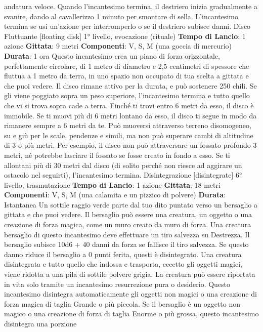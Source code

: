\begin{multicols}{2}
andatura veloce. Quando l’incantesimo termina, il
destriero inizia gradualmente a svanire, dando al
cavallerizzo 1 minuto per smontare di sella.
L’incantesimo termina se usi un’azione per
interromperlo o se il destriero subisce danni.
Disco Fluttuante
[floating disk]
1° livello, evocazione (rituale)
\textbf{Tempo di Lancio}: 1 azione
\textbf{Gittata}: 9 metri
\textbf{Componenti}: V, S, M (una goccia di mercurio)
\textbf{Durata}: 1 ora
Questo incantesimo crea un piano di forza orizzontale,
perfettamente circolare, di 1 metro di diametro e 2,5
centimetri di spessore che fluttua a 1 metro da terra, in
uno spazio non occupato di tua scelta a gittata e che
puoi vedere. Il disco rimane attivo per la durata, e può
sostenere 250 chili. Se gli viene poggiato sopra un peso
superiore, l’incantesimo termina e tutto quello che vi si
trova sopra cade a terra.
Finché ti trovi entro 6 metri da esso, il disco è immobile.
Se ti muovi più di 6 metri lontano da esso, il disco ti
segue in modo da rimanere sempre a 6 metri da te. Può
muoversi attraverso terreno disomogeneo, su e giù per
le scale, pendenze e simili, ma non può superare cambi
di altitudine di 3 o più metri. Per esempio, il disco non
può attraversare un fossato profondo 3 metri, né
potrebbe lasciare il fossato se fosse creato in fondo a
esso.
Se ti allontani più di 30 metri dal disco (di solito perché
non riesce ad aggirare un ostacolo nel seguirti),
l’incantesimo termina.
Disintegrazione
[disintegrate]
6° livello, trasmutazione
\textbf{Tempo di Lancio}: 1 azione
\textbf{Gittata}: 18 metri
\textbf{Componenti}: V, S, M (una calamita e un pizzico di
polvere)
\textbf{Durata}: Istantanea
Un sottile raggio verde parte dal tuo dito puntato verso
un bersaglio a gittata e che puoi vedere. Il bersaglio
può essere una creatura, un oggetto o una creazione di
forza magica, come un muro creato da muro di forza.
Una creatura bersaglio di questo incantesimo deve
effettuare un tiro salvezza su Destrezza. Il bersaglio
subisce 10d6 + 40 danni da forza se fallisce il tiro
salvezza. Se questo danno riduce il bersaglio a 0 punti
ferita, questi è disintegrato.
Una creatura disintegrata e tutto quello che indossa e
trasporta, eccetto gli oggetti magici, viene ridotta a una
pila di sottile polvere grigia. La creatura può essere
riportata in vita solo tramite un incantesimo
resurrezione pura o desiderio.
Questo incantesimo disintegra automaticamente gli
oggetti non magici o una creazione di forza magica di
taglia Grande o più piccola. Se il bersaglio è un oggetto
non magico o una creazione di forza di taglia Enorme o
più grossa, questo incantesimo disintegra una porzione

\end{multicols}
